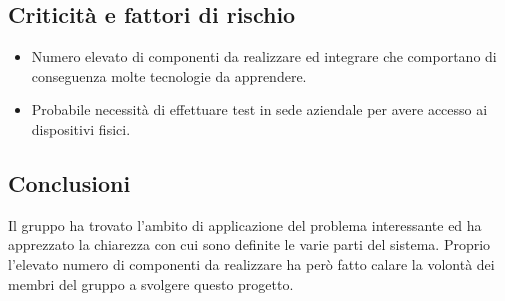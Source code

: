 \subsection{Criticità e fattori di rischio}
\begin{itemize}
	\item Numero elevato di componenti da realizzare ed integrare che comportano di conseguenza molte tecnologie da apprendere. 
	\item Probabile necessità di effettuare test in sede aziendale per avere accesso ai dispositivi fisici.
\end{itemize}
\subsection{Conclusioni}
Il gruppo ha trovato l'ambito di applicazione del problema interessante ed ha apprezzato la chiarezza con cui sono definite le varie parti del sistema. Proprio l'elevato numero di componenti da realizzare ha però fatto calare la volontà dei membri del gruppo a svolgere questo progetto.
